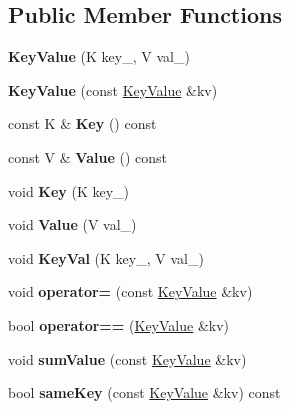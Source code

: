 \subsection*{\-Public \-Member \-Functions}
\begin{DoxyCompactItemize}
\item 
\hypertarget{class_key_value_a7db11022344a7b927223f3e87fa63e69}{{\bfseries \-Key\-Value} (\-K key\-\_\-, \-V val\-\_\-)}\label{class_key_value_a7db11022344a7b927223f3e87fa63e69}

\item 
\hypertarget{class_key_value_ae4ea8e7bf68b0bae160108622497c287}{{\bfseries \-Key\-Value} (const \hyperlink{class_key_value}{\-Key\-Value} \&kv)}\label{class_key_value_ae4ea8e7bf68b0bae160108622497c287}

\item 
\hypertarget{class_key_value_a39f6e53de9df547cd6b9f6e414f95f01}{const \-K \& {\bfseries \-Key} () const }\label{class_key_value_a39f6e53de9df547cd6b9f6e414f95f01}

\item 
\hypertarget{class_key_value_a24db94572b5cb3117524f91f7927d8b8}{const \-V \& {\bfseries \-Value} () const }\label{class_key_value_a24db94572b5cb3117524f91f7927d8b8}

\item 
\hypertarget{class_key_value_a6ae6fdd42f97db278f44b1fd247f5e26}{void {\bfseries \-Key} (\-K key\-\_\-)}\label{class_key_value_a6ae6fdd42f97db278f44b1fd247f5e26}

\item 
\hypertarget{class_key_value_ada87254eda6cc833578d5a001c3c08e7}{void {\bfseries \-Value} (\-V val\-\_\-)}\label{class_key_value_ada87254eda6cc833578d5a001c3c08e7}

\item 
\hypertarget{class_key_value_ae093f9a98b1d9670f386e2f008f5a97b}{void {\bfseries \-Key\-Val} (\-K key\-\_\-, \-V val\-\_\-)}\label{class_key_value_ae093f9a98b1d9670f386e2f008f5a97b}

\item 
\hypertarget{class_key_value_ad9fc3e92e9ccc30350da0ad4e5e7100e}{void {\bfseries operator=} (const \hyperlink{class_key_value}{\-Key\-Value} \&kv)}\label{class_key_value_ad9fc3e92e9ccc30350da0ad4e5e7100e}

\item 
\hypertarget{class_key_value_abb0770976789c796d9e1f2cc12968bea}{bool {\bfseries operator==} (\hyperlink{class_key_value}{\-Key\-Value} \&kv)}\label{class_key_value_abb0770976789c796d9e1f2cc12968bea}

\item 
\hypertarget{class_key_value_a1996c53df43ccb7b5b9ce5ca2ab86a24}{void {\bfseries sum\-Value} (const \hyperlink{class_key_value}{\-Key\-Value} \&kv)}\label{class_key_value_a1996c53df43ccb7b5b9ce5ca2ab86a24}

\item 
\hypertarget{class_key_value_a64e6a339b308fb94e3d62f10d2ac2478}{bool {\bfseries same\-Key} (const \hyperlink{class_key_value}{\-Key\-Value} \&kv) const }\label{class_key_value_a64e6a339b308fb94e3d62f10d2ac2478}

\end{DoxyCompactItemize}
